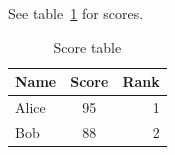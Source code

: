 \documentclass{article}
\begin{document}
See table~\ref{tab:score} for scores.
\begin{table}[h]
\centering
\begin{tabular}{|l|c|r|}
\hline
Name & Score & Rank \\
\hline
Alice & 95 & 1 \\
Bob & 88 & 2 \\
\hline
\end{tabular}
\caption{Score table}
\label{tab:score}
\end{table}
\end{document}
